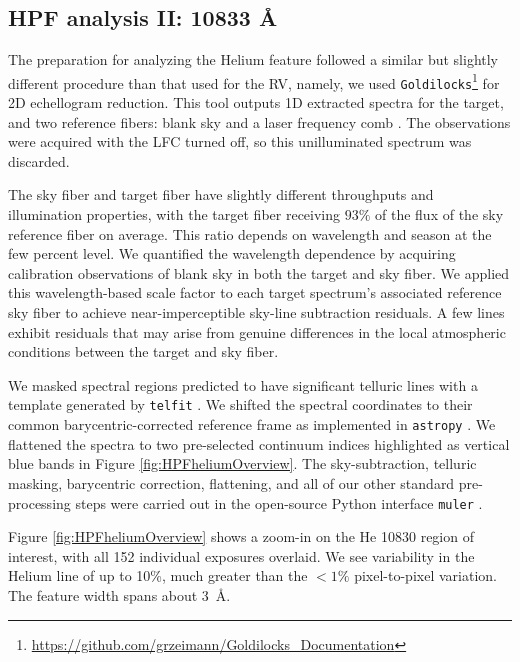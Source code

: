 \documentclass[twocolumn]{aastex631}
\begin{document}
\subsection{HPF analysis II:  10833 \AA} \label{secHeAnalysis}
The preparation for analyzing the Helium feature followed a similar but slightly different procedure than that used for the RV, namely, we used \texttt{Goldilocks}\footnote{\url{https://github.com/grzeimann/Goldilocks_Documentation}} for 2D echellogram reduction.  This tool outputs 1D extracted spectra for the target, and two reference fibers: blank sky and a laser frequency comb \citep[LFC,][]{2019Optic...6..233M}.  The observations were acquired with the LFC turned off, so this unilluminated spectrum was discarded.

The sky fiber and target fiber have slightly different throughputs and illumination properties, with the target fiber receiving $93\%$ of the flux of the sky reference fiber on average.  This ratio depends on wavelength and season at the few percent level.  We quantified the wavelength dependence by acquiring calibration observations of blank sky in both the target and sky fiber.  We applied this wavelength-based scale factor to each target spectrum's associated reference sky fiber to achieve near-imperceptible sky-line subtraction residuals.  A few lines exhibit residuals that may arise from genuine differences in the local atmospheric conditions between the target and sky fiber.

We masked spectral regions predicted to have significant telluric lines with a template generated by \texttt{telfit} \citep{2014AJ....148...53G}.  We shifted the spectral coordinates to their common barycentric-corrected reference frame \citep{2014PASP..126..838W} as implemented in \texttt{astropy} \citep{2013A&A...558A..33A,2018AJ....156..123A,2022ApJ...935..167A}.  We flattened the spectra to two pre-selected continuum indices highlighted as vertical blue bands in Figure \ref{fig:HPFheliumOverview}.  The sky-subtraction, telluric masking, barycentric correction, flattening, and all of our other standard pre-processing steps were carried out in the open-source Python interface \texttt{muler} \citep{2022JOSS....7.4302G}.

Figure \ref{fig:HPFheliumOverview} shows a zoom-in on the He 10830 region of interest, with all 152 individual exposures overlaid.  We see variability in the Helium line of up to 10\%, much greater than the $<1\%$ pixel-to-pixel variation.  The feature width spans about 3~\AA.
\end{document}

